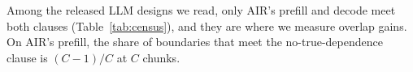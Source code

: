 Among the released LLM designs we read, only AIR's prefill and decode meet both clauses (Table~\ref{tab:census}), and they are where we measure overlap gains.
On AIR's prefill, the share of boundaries that meet the no-true-dependence clause is $(C-1)/C$ at $C$ chunks.
